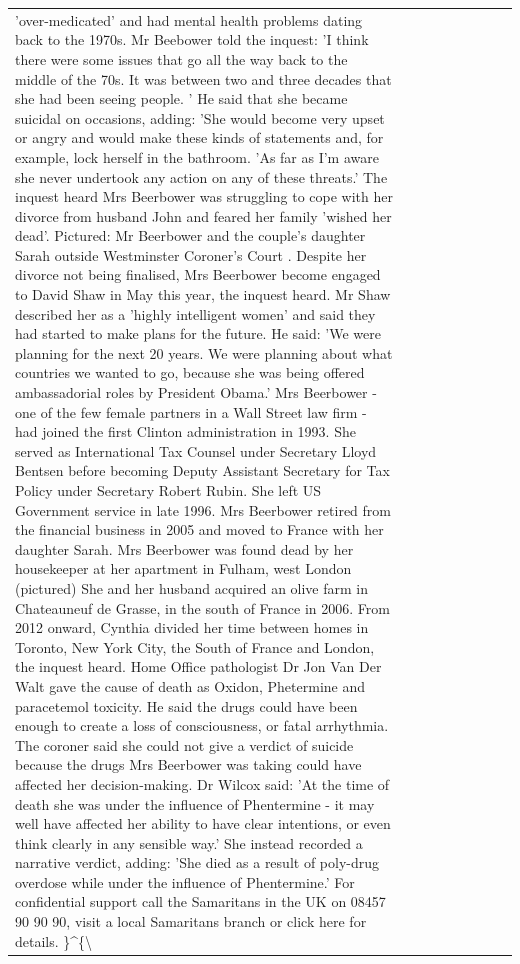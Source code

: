 \begin{table}[H]
\begin{tabular}{lllrlllll}
'over-medicated' and had mental health problems dating back to the 1970s. Mr Beebower told the inquest: 'I think there were some issues that go all the way back to the middle of the 70s. It was between two and three decades that she had been seeing people. ' He said that she became suicidal on occasions, adding: 'She would become very upset or angry and would make these kinds of statements and, for example, lock herself in the bathroom. 'As far as I'm aware she never undertook any action on any of these threats.' The inquest heard Mrs Beerbower was struggling to cope with her divorce from husband John and feared her family 'wished her dead'. Pictured: Mr Beerbower and the couple's daughter Sarah outside Westminster Coroner's Court . Despite her divorce not being finalised, Mrs Beerbower become engaged to David Shaw in May this year, the inquest heard. Mr Shaw described her as a 'highly intelligent women' and said they had started to make plans for the future. He said: 'We were planning for the next 20 years. We were planning about what countries we wanted to go, because she was being offered ambassadorial roles by President Obama.' Mrs Beerbower - one of the few female partners in a Wall Street law firm - had joined the first Clinton administration in 1993. She served as International Tax Counsel under Secretary Lloyd Bentsen before becoming Deputy Assistant Secretary for Tax Policy under Secretary Robert Rubin. She left US Government service in late 1996. Mrs Beerbower retired from the financial business in 2005 and moved to France with her daughter Sarah. Mrs Beerbower was found dead by her housekeeper at her apartment in Fulham, west London (pictured) She and her husband acquired an olive farm in Chateauneuf de Grasse, in the south of France in 2006. From 2012 onward, Cynthia divided her time between homes in Toronto, New York City, the South of France and London, the inquest heard. Home Office pathologist Dr Jon Van Der Walt gave the cause of death as Oxidon, Phetermine and paracetemol toxicity. He said the drugs could have been enough to create a loss of consciousness, or fatal arrhythmia. The coroner said she could not give a verdict of suicide because the drugs Mrs Beerbower was taking could have affected her decision-making. Dr Wilcox said: 'At the time of death she was under the influence of Phentermine - it may well have affected her ability to have clear intentions, or even think clearly in any sensible way.' She instead recorded a narrative verdict, adding: 'She died as a result of poly-drug overdose while under the influence of Phentermine.' For confidential support call the Samaritans in the UK on 08457 90 90 90, visit a local Samaritans branch or click here for details. \}\textasciicircum \{\textbackslash  \\

\end{tabular}
\end{table}
